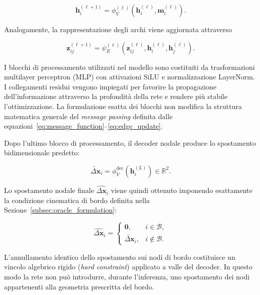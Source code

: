 \begin{equation}
\mathbf{h}_i^{(\ell+1)}
=
\phi_V^{(\ell)}
\left(
\mathbf{h}_i^{(\ell)},
\mathbf{m}_i^{(\ell)}
\right).
\label{eq:node_update}
\end{equation}

Analogamente, la rappresentazione degli archi viene aggiornata attraverso

\begin{equation}
\mathbf{z}_{ij}^{(\ell+1)}
=
\psi_E^{(\ell)}
\left(
\mathbf{z}_{ij}^{(\ell)},
\mathbf{h}_i^{(\ell)},
\mathbf{h}_j^{(\ell)}
\right).
\label{eq:edge_update}
\end{equation}

I blocchi di processamento utilizzati nel modello sono costituiti da trasformazioni multilayer perceptron (MLP) con attivazioni SiLU e normalizzazione LayerNorm. I collegamenti residui vengono impiegati per favorire la propagazione dell'informazione attraverso la profondità della rete e rendere più stabile l'ottimizzazione. La formulazione esatta dei blocchi non modifica la struttura matematica generale del \textit{message passing} definita dalle equazioni~\eqref{eq:message_function}--\eqref{eq:edge_update}.

Dopo l'ultimo blocco di processamento, il decoder nodale produce lo spostamento bidimensionale predetto:

\begin{equation}
\widetilde{\Delta\mathbf{x}}_i
=
\phi_V^{\mathrm{dec}}
\left(
\mathbf{h}_i^{(L)}
\right)
\in\mathbb{R}^{2}.
\label{eq:gnn_decoder}
\end{equation}

Lo spostamento nodale finale $\widehat{\Delta\mathbf{x}}_i$ viene quindi ottenuto imponendo esattamente la condizione cinematica di bordo definita nella Sezione~\ref{subsec:oracle_formulation}:

\begin{equation}
\widehat{\Delta\mathbf{x}}_i
=
\begin{cases}
\mathbf{0}, & i\in\mathcal{B},\\
\widetilde{\Delta\mathbf{x}}_i, & i\notin\mathcal{B}.
\end{cases}
\label{eq:boundary_mask}
\end{equation}

L'annullamento identico dello spostamento sui nodi di bordo costituisce un vincolo algebrico rigido (\textit{hard constraint}) applicato a valle del decoder. In questo modo la rete non può introdurre, durante l'inferenza, uno spostamento dei nodi appartenenti alla geometria prescritta del bordo.

